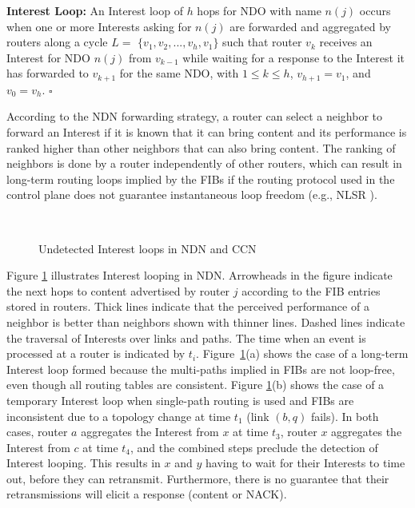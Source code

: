 \documentclass{ancs15-alternate}
\begin{document}
\vspace{0.1in}
{\bf  Interest Loop:}  
An Interest loop of $h$ hops for NDO with name  $n(j)$ occurs  when one or more Interests asking for $n(j)$ are forwarded and aggregated by routers along a cycle $L = $   $\{ v_1 , v_2 , ..., v_h , v_1 \}$
such that router $v_k$ receives an Interest for NDO $n(j)$ from $v_{k-1}$ while waiting for a response to the Interest it has forwarded to $v_{k+1}$ for the same NDO, with $1 \leq k \leq h$, $v_{h+1} = v_1$, and $v_{0} = v_h$. $\square$

\vspace{0.1in}
According to the NDN forwarding strategy, a router can select a  neighbor 
to forward an Interest if it is known that it can bring content 
and its performance is ranked higher than other neighbors that can also bring content. The ranking of  neighbors  is done by a router independently of other routers, which can result in long-term routing loops implied by the FIBs if the routing protocol used in the control plane does not guarantee instantaneous loop freedom (e.g., NLSR \cite{nlsr}). 


\vspace{-0.15in}
\begin{figure}[h]
\begin{centering}
    \mbox{
      }
\vspace{-0.15in}
   \caption{Undetected Interest loops in NDN and CCN
   }
   \label{ndn-loop}
\end{centering} 
\end{figure}  


Figure \ref{ndn-loop}  illustrates Interest looping in NDN. 
Arrowheads in the figure indicate the next hops to content advertised by router $j$  according to the FIB entries stored in routers.  Thick lines indicate that the perceived performance of a neighbor is 
better than neighbors shown with thinner lines.   Dashed lines indicate the traversal of Interests over links and paths. The time when an event is processed at a router is indicated by $t_i$.
Figure~\ref{ndn-loop}(a) shows the case of a long-term Interest loop formed because the  multi-paths implied in FIBs are not loop-free, even though all routing tables are consistent. 
Figure \ref{ndn-loop}(b) shows the case of a temporary Interest loop when single-path routing is used and FIBs are inconsistent due to a topology change at time $t_1$ (link $(b, q)$ fails). In both cases, router $a$ aggregates  the Interest from $x$ at time $t_3$,  router $x$ aggregates the Interest from $c$ at time $t_4$, and the combined steps preclude the detection of Interest looping. This results in $x$ and $y$ having to wait for their Interests to time out, before they can retransmit. Furthermore, there is no guarantee that their retransmissions will elicit a response (content or NACK).
 
\end{document}
